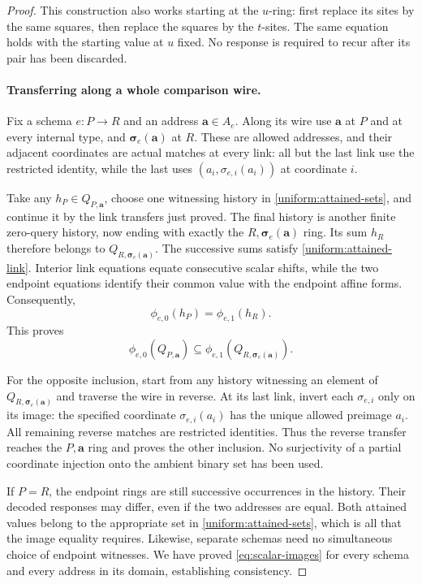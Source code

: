 \documentclass[11pt]{article}
\theoremstyle{definition}
\begin{document}
\begin{proof}
This construction also works starting at the $u$-ring: first replace its
sites by the same squares, then replace the squares by the $t$-sites.
The same equation holds with the starting value at $u$ fixed.  No response
is required to recur after its pair has been discarded.

\paragraph{Transferring along a whole comparison wire.}
Fix a schema $e:P\to R$ and an address $\mathbf a\in A_e$.  Along its
wire use $\mathbf a$ at $P$ and at every internal type, and
$\boldsymbol\sigma_e(\mathbf a)$ at $R$.  These are allowed addresses,
and their adjacent coordinates are actual matches at every link: all
but the last link use the restricted identity, while the last uses
$(a_i,\sigma_{e,i}(a_i))$ at coordinate $i$.

Take any $h_P\in Q_{P,\mathbf a}$, choose one witnessing history in
\eqref{uniform:attained-sets}, and continue it by the link transfers just
proved.  The final history is another finite zero-query history, now ending
with exactly the $R,\boldsymbol\sigma_e(\mathbf a)$ ring.  Its sum
$h_R$ therefore belongs to
$Q_{R,\boldsymbol\sigma_e(\mathbf a)}$.  The successive sums satisfy
\eqref{uniform:attained-link}.  Interior link equations equate consecutive
scalar shifts, while the two endpoint equations identify their common
value with the endpoint affine forms.  Consequently,
\[
 \phi_{e,0}(h_P)=\phi_{e,1}(h_R).
\]
This proves
\[
 \phi_{e,0}(Q_{P,\mathbf a})
 \subseteq
 \phi_{e,1}(Q_{R,\boldsymbol\sigma_e(\mathbf a)}).
\]

For the opposite inclusion, start from any history witnessing an element
of $Q_{R,\boldsymbol\sigma_e(\mathbf a)}$ and traverse the wire in reverse.
At its last link, invert each $\sigma_{e,i}$ only on its image: the
specified coordinate $\sigma_{e,i}(a_i)$ has the unique allowed preimage
$a_i$.  All remaining reverse matches are restricted identities.  Thus
the reverse transfer reaches the $P,\mathbf a$ ring and proves the other
inclusion.  No surjectivity of a partial coordinate injection onto the
ambient binary set has been used.

If $P=R$, the endpoint rings are still successive occurrences in the
history.  Their decoded responses may differ, even if the two addresses
are equal.  Both attained values belong to the appropriate set in
\eqref{uniform:attained-sets}, which is all that the image equality requires.
Likewise, separate schemas need no simultaneous choice of endpoint
witnesses.  We have proved \eqref{eq:scalar-images} for every schema and
every address in its domain, establishing consistency.
\end{proof}
\end{document}
